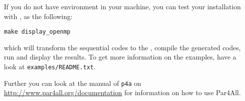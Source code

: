 \documentclass[a4paper]{article}
\begin{document}
If you do not have \Acuda environment in your machine, you can test your
installation with \Aopenmp, as the following:
\begin{verbatim}
make display_openmp
\end{verbatim}
which will transform the sequential codes to the \Aopenmp, compile the
generated codes, run and display the results.  To get more information on
the examples, have a look at \texttt{examples/README.txt}.

Further you can look at the manual of \texttt{p4a} on
\url{http://www.par4all.org/documentation} for information on how to use Par4All.
\end{document}

